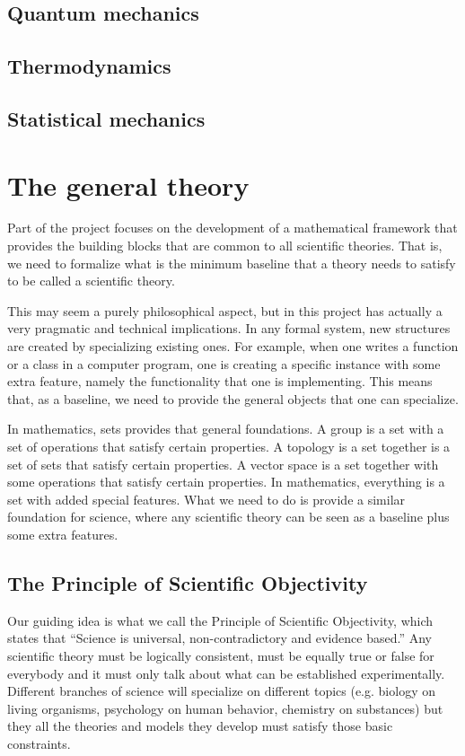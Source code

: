 \documentclass[twocolumn]{article}
\begin{document}
\subsection{Quantum mechanics}

\subsection{Thermodynamics}

\subsection{Statistical mechanics}

\section{The general theory}

Part of the project focuses on the development of a mathematical framework that provides the building blocks that are common to all scientific theories. That is, we need to formalize what is the minimum baseline that a theory needs to satisfy to be called a scientific theory.

This may seem a purely philosophical aspect, but in this project has actually a very pragmatic and technical implications. In any formal system, new structures are created by specializing existing ones. For example, when one writes a function or a class in a computer program, one is creating a specific instance with some extra feature, namely the functionality that one is implementing. This means that, as a baseline, we need to provide the general objects that one can specialize.

In mathematics, sets provides that general foundations. A group is a set with a set of operations that satisfy certain properties. A topology is a set together is a set of sets that satisfy certain properties. A vector space is a set together with some operations that satisfy certain properties. In mathematics, everything is a set with added special features. What we need to do is provide a similar foundation for science, where any scientific theory can be seen as a baseline plus some extra features.

\subsection{The Principle of Scientific Objectivity}

Our guiding idea is what we call the Principle of Scientific Objectivity, which states that ``Science is universal, non-contradictory and evidence based.'' Any scientific theory must be logically consistent, must be equally true or false for everybody and it must only talk about what can be established experimentally. Different branches of science will specialize on different topics (e.g. biology on living organisms, psychology on human behavior, chemistry on substances) but they all the theories and models they develop must satisfy those basic constraints.
\end{document}
